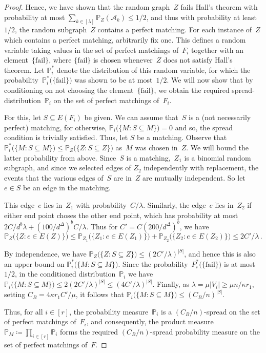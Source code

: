 \documentclass[final]{article}
\theoremstyle{definition}
\newcommand{\fail}{\mathrm{fail}}
\begin{document}
\begin{proof}
    Hence, we have shown that the random graph~$Z$ fails Hall's theorem with probability at most $\sum_{k \in [\lambda]} \mathds{P}_Z(\mathcal{A}_k) \leq 1/2$, and thus with probability at least~$1/2$, the random subgraph~$Z$ contains a perfect matching. For each instance of~$Z$ which contains a perfect matching, arbitrarily fix one. This defines a random variable taking values in the set of perfect matchings of~$F_i$ together with an element~$\{\fail\}$, where $\{\fail\}$ is chosen whenever~$Z$ does not satisfy Hall's theorem. Let  $\mathds{P}_i^*$ denote the distribution of this random variable, for which the probability~$\mathds{P}_i^*\bigl(\{\fail\}\bigr)$ was shown to be at most~$1/2$. We will now show that by conditioning on not choosing the element~$\{\fail\}$, we obtain the required spread-distribution~$\mathds{P}_i$ on the set of perfect matchings of~$F_i$. 
    
    For this, let $S \subseteq E(F_i)$ be given. We can assume that~$S$ is a (not necessarily perfect) matching, for otherwise, $\mathds{P}_i\bigl(\{M : S \subseteq M\}\bigr) = 0$ and so, the spread condition is trivially satisfied. Thus, let $S$ be a matching. Observe that $\mathds{P}_i^*\bigl(\{M:S\subseteq M\}\bigr)\le\mathds{P}_Z\bigl(\{Z:S\subseteq Z\}\bigr)$ as~$M$ was chosen in~$Z$. We will bound the latter probability from above. Since~$S$ is a matching,~$Z_1$ is a binomial random subgraph, and since we selected edges of $Z_2$ independently with replacement, the events that the various edges of~$S$ are in~$Z$ are mutually independent. So let~$e \in S$ be an edge in the matching. 
    
    This edge~$e$ lies in~$Z_1$ with probability~$C/\lambda$. Similarly, the edge~$e$ lies in~$Z_2$ if either end point choses the other end point, which has probability at most $2C/d^b\lambda + (100/d^{\Delta})^b C/\lambda$. Thus for $C' = C(200/d^{\Delta})^b$, we have
    \[\mathds{P}_Z\bigl(\{Z:e\in E(Z)\}\bigr)\le \mathds{P}_{Z_1}\bigl(\{Z_1:e\in E(Z_1)\}\bigr)+\mathds{P}_{Z_2}\bigl(\{Z_2:e\in E(Z_2)\}\bigr)\le 2C'/\lambda\,.\]
    
    By independence, we have $\mathds{P}_Z\bigl(\{Z:S\subseteq Z\}\bigr)\le (2C'/\lambda)^{|S|}$, and hence this is also an upper bound on $\mathds{P}_i^*\bigl(\{M:S\subseteq M\}\bigr)$. Since the probability~$P_i^*\bigl(\{\mathrm{fail}\}\bigr)$ is at most~$1/2$, in the conditioned distribution~$\mathds{P}_i$ we have $\mathds{P}_i\bigl(\{M:S\subseteq M\}\bigr)\le 2(2C'/\lambda)^{|S|}\le (4C'/\lambda)^{|S|}$. Finally, as $\lambda = \mu |V_i| \geq \mu n/ \kappa r_1$, setting $C_B = 4\kappa r_1 C'/\mu$, it follows that $\mathds{P}_i\big(\{M: S \subseteq M\}\big) \leq (C_B/n)^{|S|}$. 
    
    Thus, for all $i \in [r]$, the probability measure~$\mathds{P}_i$ is a $(C_B/n)$-spread on the set of perfect matchings of~$F_i$, and consequently, the product measure $\mathds{P}_M \coloneqq \prod_{i \in [r]} \mathds{P}_i$ forms the required $(C_B/n)$-spread probability measure on the set of perfect matchings of~$F$.  
\end{proof}
\end{document}
